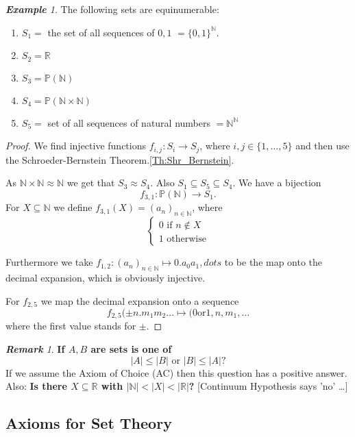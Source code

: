 \documentclass[a4paper,oneside,11pt,DIV=12,parskip=half]{scrartcl}
\newcommand{\R}{\mathbb R}
\newcommand{\N}{\mathbb N}
\theoremstyle{plain}
\theoremstyle{definition}
\newtheorem{remark, definition}[theorem]{Remark and Definition.}
\newtheorem{lemma, definition}[theorem]{Lemma and Definition.}
\newtheorem{theorem, definition}[theorem]{Theorem and Definition.}
\theoremstyle{remark}
\newtheorem*{remark}{\textbf{Remark}}
\newtheorem*{example}{\textbf{Example}}
\newtheorem*{remark, example}{\textbf{Remark and Exercise}}
\begin{document}
\begin{example}
The following sets are equinumerable:
\begin{enumerate}
    \item $S_1 = $ the set of all sequences of $0,1$ $= \{0,1\} ^{\N}$.
    \item $S_2 = \R$
    \item $S_3 = \mathbb{P}(\N)$
    \item $S_4=  \mathbb{P}(\N \times \N)$
    \item $S_5 = $ set of all sequences of natural numbers $= \N^\N$
\end{enumerate}

\begin{proof}
We find injective functions $f_{i,j}: S_i \rightarrow S_j$, where $i,j \in \{ 1, \dots, 5\}$ and then use the Schroeder-Bernstein Theorem.\ref{Th:Shr_Bernstein}.

As $\N \times \N \approx \N$ we get that $S_3 \approx S_4$. Also $S_1 \subseteq S_5 \subseteq S_4$. We have a bijection
    \[ f_{3,1}: \mathbb{P}(\N) \rightarrow S_1. \]
For $X \subseteq \N$ we define $f_{3,1}(X) = (a_n)_{n \in \N}$, where 
    \[ \begin{cases} 0 \text{ if } n \not \in X \\ 
                    1 \text{ otherwise} \end{cases} \]
                    
Furthermore we take $f_{1,2}: (a_n)_{n \in \N} \mapsto 0.a_0a_1, dots$ to be the map onto the decimal expansion, which is obviously injective.

For $f_{2,5}$ we map the decimal expansion onto a sequence
    \[ f_{2,5}(\pm n.m_1m_2\dots \mapsto (0 \text{or} 1, n, m_1, \dots \] where the first value stands for $\pm$.
\end{proof}
\end{example}

\begin{remark}
\textbf{If $A,B$ are sets is one of}
    \[ |A| \leq |B| \text{ or } |B| \leq |A| ?\]
    If we assume the Axiom of Choice (AC) then this question has a positive answer.
    Also: \textbf{Is there $X \subseteq \R$ with $| \N | < |X| < |\R|$?}
    [Continuum Hypothesis says 'no' \dots]
\end{remark}

\subsection{Axioms for Set Theory}
\end{document}
